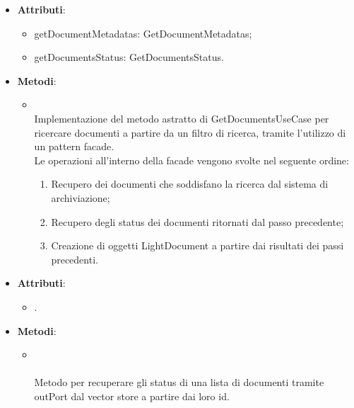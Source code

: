 \documentclass[10pt, a4paper]{article}
\begin{document}
\label{GetDocumentsFacadeServiceDettaglio}
\begin{itemize}
    \item \textbf{Attributi}:
    \begin{itemize}
        \item getDocumentMetadatas: GetDocumentMetadatas;
        \item getDocumentsStatus: GetDocumentsStatus.
    \end{itemize}
    \item \textbf{Metodi}:
    \begin{itemize}
        \item {}\\
        Implementazione del metodo astratto di GetDocumentsUseCase per ricercare documenti a partire da un filtro di ricerca, tramite l'utilizzo di un pattern facade.\\
        Le operazioni all'interno della facade vengono svolte nel seguente ordine:
        \begin{enumerate}
            \item Recupero dei documenti che soddisfano la ricerca dal sistema di archiviazione;
            \item Recupero degli status dei documenti ritornati dal passo precedente;
            \item Creazione di oggetti LightDocument a partire dai risultati dei passi precedenti.
        \end{enumerate}
    \end{itemize}
\end{itemize}

\label{GetDocumentsStatusDettaglio}
\begin{itemize}
    \item \textbf{Attributi}:
    \begin{itemize}
        \item {}.
    \end{itemize}
    \item \textbf{Metodi}:
    \begin{itemize}
        \item {}\\ \\
        Metodo per recuperare gli status di una lista di documenti tramite outPort dal vector store a partire dai loro id.
    \end{itemize}
\end{itemize}
\end{document}

